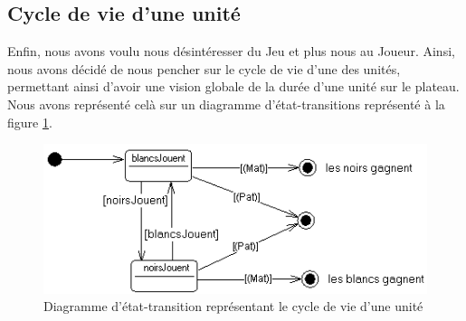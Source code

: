 \subsection{Cycle de vie d'une unité}
Enfin, nous avons voulu nous désintéresser du Jeu et plus nous  au Joueur. Ainsi, nous avons décidé de nous pencher sur le cycle de vie d'une des unités, permettant ainsi d'avoir une vision globale de la durée d'une unité sur le plateau. Nous avons représenté celà sur un diagramme d'état-transitions représenté à la figure \ref{etata}.

\begin{figure}[!h] 
\centerline{\includegraphics[scale=0.30]{img/etata_ex.png}}
   \caption{\label{étiquette} Diagramme d'état-transition représentant le cycle de vie d'une unité}
\label{etata}
\end{figure}
\newpage
